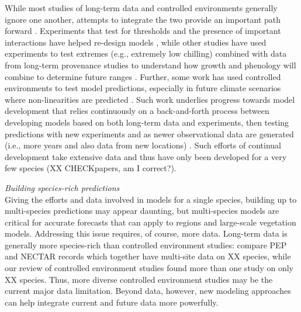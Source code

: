 \documentclass[11pt,letter]{article}
\begin{document}
While most studies of long-term data and controlled environments generally ignore one another, attempts to integrate the two provide an important path forward \citep{Caffarra:2011qf,nagano2012,satake2013,ford2016,chuinearees}. Experiments that test for thresholds and the presence of important interactions have helped re-design models \citep{Caffarra:2011qf,chuinearees}, while other studies have used experiments to test extremes (e.g., extremely low chilling) combined with data from long-term provenance studies to understand how growth and phenology will combine to determine future ranges \citep{ford2016}. Further, some work has used controlled environments to test model predictions, especially in future climate scenarios where non-linearities are predicted \citep[see][]{nagano2012}. Such work underlies progress towards model development that relies continuously on a back-and-forth process between developing models based on both long-term data and experiments, then testing predictions with new experiments and as newer observational data are generated (i.e., more years and also data from new locations) \citep{nagano2012,satake2013}. Such efforts of continual development take extensive data and thus have only been developed for a very few species (XX CHECKpapers, am I correct?).

\emph{Building species-rich predictions}\\
Giving the efforts and data involved in models for a single species, building up to multi-species predictions may appear daunting, but multi-species models are critical for accurate forecasts that can apply to regions and large-scale vegetation models. Addressing this issue requires, of course, more data. Long-term data is generally more species-rich than controlled environment studies: compare PEP and NECTAR records which together have multi-site data on XX species, while our review of controlled environment studies found more than one study on only XX species. Thus, more diverse controlled environment studies may be the current major data limitation. Beyond data, however, new modeling approaches can help integrate current and future data more powerfully. 
\end{document}
